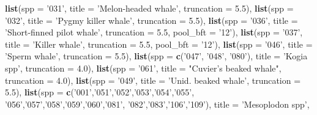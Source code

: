 \documentclass[
]{book}
\newenvironment{Shaded}{\begin{snugshade}}{\end{snugshade}}
\newcommand{\DataTypeTok}[1]{\textcolor[rgb]{0.13,0.29,0.53}{#1}}
\newcommand{\FloatTok}[1]{\textcolor[rgb]{0.00,0.00,0.81}{#1}}
\newcommand{\KeywordTok}[1]{\textcolor[rgb]{0.13,0.29,0.53}{\textbf{#1}}}
\newcommand{\NormalTok}[1]{#1}
\newcommand{\StringTok}[1]{\textcolor[rgb]{0.31,0.60,0.02}{#1}}
\begin{document}
\begin{Shaded}
\begin{Highlighting}[]
  \KeywordTok{list}\NormalTok{(}\DataTypeTok{spp =} \StringTok{'031'}\NormalTok{,}
       \DataTypeTok{title =} \StringTok{'Melon-headed whale'}\NormalTok{,}
       \DataTypeTok{truncation =} \FloatTok{5.5}\NormalTok{),}
  \KeywordTok{list}\NormalTok{(}\DataTypeTok{spp =} \StringTok{'032'}\NormalTok{,}
       \DataTypeTok{title =} \StringTok{'Pygmy killer whale'}\NormalTok{,}
       \DataTypeTok{truncation =} \FloatTok{5.5}\NormalTok{),}
  \KeywordTok{list}\NormalTok{(}\DataTypeTok{spp =} \StringTok{'036'}\NormalTok{,}
       \DataTypeTok{title =} \StringTok{'Short-finned pilot whale'}\NormalTok{,}
       \DataTypeTok{truncation =} \FloatTok{5.5}\NormalTok{,}
       \DataTypeTok{pool_bft =} \StringTok{'12'}\NormalTok{),}
  \KeywordTok{list}\NormalTok{(}\DataTypeTok{spp =} \StringTok{'037'}\NormalTok{,}
       \DataTypeTok{title =} \StringTok{'Killer whale'}\NormalTok{,}
       \DataTypeTok{truncation =} \FloatTok{5.5}\NormalTok{,}
       \DataTypeTok{pool_bft =} \StringTok{'12'}\NormalTok{),}
  \KeywordTok{list}\NormalTok{(}\DataTypeTok{spp =} \StringTok{'046'}\NormalTok{,}
       \DataTypeTok{title =} \StringTok{'Sperm whale'}\NormalTok{,}
       \DataTypeTok{truncation =} \FloatTok{5.5}\NormalTok{),}
  \KeywordTok{list}\NormalTok{(}\DataTypeTok{spp =} \KeywordTok{c}\NormalTok{(}\StringTok{'047'}\NormalTok{, }\StringTok{'048'}\NormalTok{, }\StringTok{'080'}\NormalTok{),}
       \DataTypeTok{title =} \StringTok{'Kogia spp'}\NormalTok{,}
       \DataTypeTok{truncation =} \FloatTok{4.0}\NormalTok{),}
  \KeywordTok{list}\NormalTok{(}\DataTypeTok{spp =} \StringTok{'061'}\NormalTok{,}
       \DataTypeTok{title =} \StringTok{"Cuvier's beaked whale"}\NormalTok{,}
       \DataTypeTok{truncation =} \FloatTok{4.0}\NormalTok{),}
  \KeywordTok{list}\NormalTok{(}\DataTypeTok{spp =} \StringTok{'049'}\NormalTok{,}
       \DataTypeTok{title =} \StringTok{'Unid. beaked whale'}\NormalTok{,}
       \DataTypeTok{truncation =} \FloatTok{5.5}\NormalTok{),}
  \KeywordTok{list}\NormalTok{(}\DataTypeTok{spp =} \KeywordTok{c}\NormalTok{(}\StringTok{'001'}\NormalTok{,}\StringTok{'051'}\NormalTok{,}\StringTok{'052'}\NormalTok{,}\StringTok{'053'}\NormalTok{,}\StringTok{'054'}\NormalTok{,}\StringTok{'055'}\NormalTok{,}
               \StringTok{'056'}\NormalTok{,}\StringTok{'057'}\NormalTok{,}\StringTok{'058'}\NormalTok{,}\StringTok{'059'}\NormalTok{,}\StringTok{'060'}\NormalTok{,}\StringTok{'081'}\NormalTok{,}
               \StringTok{'082'}\NormalTok{,}\StringTok{'083'}\NormalTok{,}\StringTok{'106'}\NormalTok{,}\StringTok{'109'}\NormalTok{),}
       \DataTypeTok{title =} \StringTok{'Mesoplodon spp'}\NormalTok{,}

\end{Highlighting}
\end{Shaded}
\end{document}
